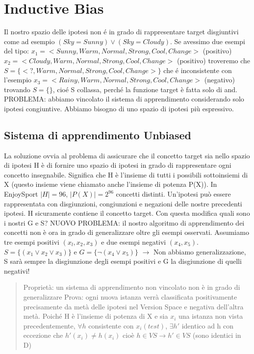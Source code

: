 \documentclass{article}
\begin{document}
\section{Inductive Bias}
Il nostro spazio delle ipotesi non é in grado di rappresentare target disgiuntivi come ad esempio $(Sky=Sunny) \lor (Sky=Cloudy)$. \newline
Se avessimo due esempi del tipo: \newline
$x_1 = <Sunny, Warm, Normal, Strong, Cool, Change>$ (positivo) \newline
$x_2 = <Cloudy, Warm, Normal, Strong, Cool, Change>$ (positivo) \newline
troveremo che $S = \{ <?, Warm, Normal, Strong, Cool, Change> \}$ \newline
che é inconsistente con l'esempio $x_3 = <Rainy, Warm, Normal, Strong, Cool, Change >$ (negativo) \newline
trovando $S = \{\}$, cioé S collassa, perché la funzione target è fatta solo di and. \newline
PROBLEMA: abbiamo vincolato il sistema di apprendimento considerando solo ipotesi congiuntive. Abbiamo bisogno di uno spazio di ipotesi più espressivo.

\subsection{Sistema di apprendimento Unbiased}
La soluzione ovvia al problema di assicurare che il concetto target sia nello spazio di ipotesi H è di fornire uno spazio di ipotesi in grado di rappresentare ogni concetto insegnabile. \newline
Significa che H è l'insieme di tutti i possibili sottoinsiemi di X (questo insieme viene chiamato anche l'insieme di potenza P(X)). In EnjoySport $|H|=96$, $|P(X)|=2^{96}$ concetti distinti. Un'ipotesi può essere rappresentata con disgiunzioni, congiunzioni e negazioni delle nostre precedenti ipotesi. H sicuramente contiene il concetto target. Con questa modifica quali sono i nostri G e S? \newline
NUOVO PROBLEMA: il nostro algoritmo di apprendimento dei concetti non è ora in grado di generalizzare oltre gli esempi osservati. Assumiamo tre esempi positivi $(x_l, x_2, x_3)$ e due esempi negativi $(x_4, x_5)$. $S = \{(x_1 \lor x_2 \lor x_3) \}$ e $G = \{\neg (x_4 \lor x_5)\}$ $\rightarrow$ Non abbiamo generalizzazione, S sarà sempre la disgiunzione degli esempi positivi e G la disgiunzione di quelli negativi!
\begin{quote}
    Proprietà: un sistema di apprendimento non vincolato non è in grado di generalizzare \newline
    Prova: ogni nuova istanza verrà classificata positivamente precisamente da metà delle ipotesi nel Version Space e negativa dell'altra metà. Poiché H è l'insieme di potenza di X e sia $x_i$ una istanza non vista precedentemente, $\forall h$ consistente con $x_i(test)$, $\exists h'$ identico ad h con eccezione che $h'(x_i) \neq h(x_i)$ cioè $h \in VS \rightarrow h' \in VS$ (sono identici in D)
\end{quote}
\end{document}
